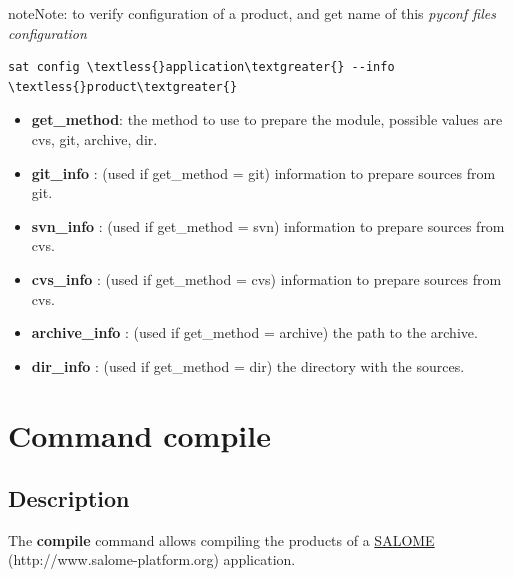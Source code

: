 \documentclass[a4paper,10pt,english]{sphinxmanual}
\begin{document}
\begin{notice}{note}{Note:}
to verify configuration of a product, and get name of this \emph{pyconf files configuration}

\begin{Verbatim}[commandchars=\\\{\}]
sat config \textless{}application\textgreater{} --info \textless{}product\textgreater{}
\end{Verbatim}
\end{notice}
\begin{itemize}
\item {} 
\textbf{get\_method}: the method to use to prepare the module, possible values are cvs, git, archive, dir.

\item {} 
\textbf{git\_info} : (used if get\_method = git) information to prepare sources from git.

\item {} 
\textbf{svn\_info} : (used if get\_method = svn) information to prepare sources from cvs.

\item {} 
\textbf{cvs\_info} : (used if get\_method = cvs) information to prepare sources from cvs.

\item {} 
\textbf{archive\_info} : (used if get\_method = archive) the path to the archive.

\item {} 
\textbf{dir\_info} : (used if get\_method = dir) the directory with the sources.

\end{itemize}
\clearpage

\section{Command compile}
\label{commands/compile:svn}\label{commands/compile:command-compile}\label{commands/compile::doc}

\subsection{Description}
\label{commands/compile:description}
The \textbf{compile} command allows compiling the products of a \href{http://www.salome-platform.org}{SALOME} (http://www.salome-platform.org) application.
\end{document}
